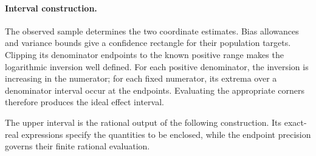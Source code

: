 \documentclass[11pt]{article}
\begin{document}
\paragraph{Interval construction.}
The observed sample  determines the two coordinate estimates. Bias allowances and variance bounds give a confidence rectangle for their population targets. Clipping its denominator endpoints to the known positive range makes the logarithmic inversion well defined. For each positive denominator, the inversion is increasing in the numerator; for each fixed numerator, its extrema over a denominator interval occur at the endpoints. Evaluating the appropriate corners therefore produces the ideal effect interval.

The upper interval  is the rational output of the following construction. Its exact-real expressions specify the quantities to be enclosed, while the endpoint precision  governs their finite rational evaluation.
\end{document}
